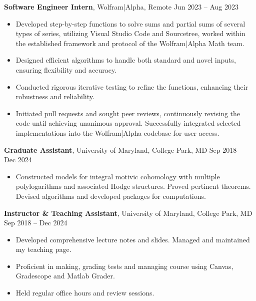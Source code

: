 \documentclass[6pt, letterpaper]{article}
\newenvironment{customItem}{
\begin{itemize}[
    topsep=0.05 cm,
    parsep=0.05 cm,
    partopsep=0pt,
    itemsep=0pt,
    leftmargin=10pt
]
}{
\end{itemize}
} %
\begin{document}
\textbf{Software Engineer Intern}, Wolfram|Alpha, Remote \hfill Jun 2023 – Aug 2023
\begin{customItem}
\item Developed step-by-step functions to solve sums and partial sums of several types of series, utilizing Visual Studio Code and Sourcetree, worked within the established framework and protocol of the Wolfram|Alpha Math team.
\item Designed efficient algorithms to handle both standard and novel inputs, ensuring flexibility and accuracy.
\item Conducted rigorous iterative testing to refine the functions, enhancing their robustness and reliability.
\item Initiated pull requests and sought peer reviews, continuously revising the code until achieving unanimous approval. Successfully integrated selected implementations into the Wolfram|Alpha codebase for user access.
\end{customItem}

\vspace{0.1 cm}

\textbf{Graduate Assistant}, University of Maryland, College Park, MD \hfill Sep 2018 – Dec 2024
\begin{customItem}
\item Constructed models for integral motivic cohomology with multiple polylogarithms and associated Hodge structures. Proved pertinent theorems. Devised algorithms and developed packages for computations.
\end{customItem}

\vspace{0.1 cm}

\textbf{Instructor \& Teaching Assistant}, University of Maryland, College Park, MD \hfill Sep 2018 – Dec 2024
\begin{customItem}
\item Developed comprehensive lecture notes and slides. Managed and maintained my teaching page.
\item Proficient in making, grading tests and managing course using Canvas, Gradescope and Matlab Grader.
\item Held regular office hours and review sessions.
\end{customItem}
\end{document}
